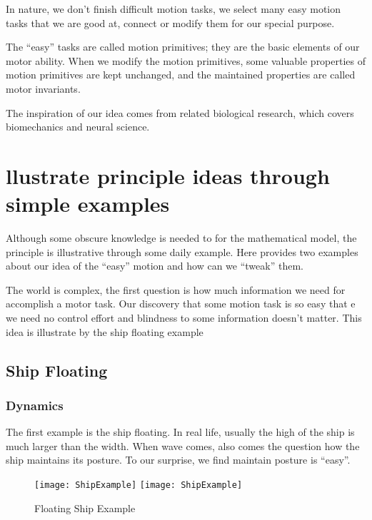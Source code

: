 In nature, we don’t finish difficult motion tasks, we select many easy motion tasks that we are good at, connect or modify them for our special purpose.

The “easy” tasks are called motion primitives; they are the basic elements of our motor ability. 
When we modify the motion primitives, some valuable properties of motion primitives are kept unchanged, and the maintained properties are called motor invariants.

The inspiration of our idea comes from related biological research, which covers biomechanics and neural science.

\section{llustrate principle ideas through simple examples}

Although some obscure knowledge is needed to for the mathematical model, the principle is illustrative through some daily example. Here provides two examples about our idea of the “easy” motion and how can we “tweak” them.

The world is complex, the first question is how much information we need for accomplish a motor task. Our discovery that some motion task is so easy that e we need no control effort and blindness to some information doesn’t matter.
This idea is illustrate by the ship floating example

\subsection{Ship Floating}


\subsubsection*{Dynamics}
The first example is the ship floating. In real life, usually the high of the ship is much larger than the width. When wave comes, also comes the question how the ship maintains its posture.
To our surprise, we find maintain posture is “easy”.



\begin{figure}[!htbp]
  \begin{center}
    \leavevmode
    \ifpdf
      \texttt{[image: ShipExample]}
    \else
      \texttt{[image: ShipExample]}
    \fi
    \caption{Floating Ship Example}
    \label{fig:ShipFloating}
  \end{center}
\end{figure}



